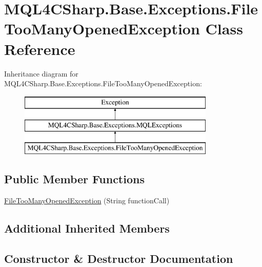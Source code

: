 \hypertarget{class_m_q_l4_c_sharp_1_1_base_1_1_exceptions_1_1_file_too_many_opened_exception}{}\section{M\+Q\+L4\+C\+Sharp.\+Base.\+Exceptions.\+File\+Too\+Many\+Opened\+Exception Class Reference}
\label{class_m_q_l4_c_sharp_1_1_base_1_1_exceptions_1_1_file_too_many_opened_exception}
Inheritance diagram for M\+Q\+L4\+C\+Sharp.\+Base.\+Exceptions.\+File\+Too\+Many\+Opened\+Exception\+:\begin{figure}[H]
\begin{center}
\leavevmode
\includegraphics[height=3.000000cm]{class_m_q_l4_c_sharp_1_1_base_1_1_exceptions_1_1_file_too_many_opened_exception}
\end{center}
\end{figure}
\subsection*{Public Member Functions}
\begin{DoxyCompactItemize}
\item 
\hyperlink{class_m_q_l4_c_sharp_1_1_base_1_1_exceptions_1_1_file_too_many_opened_exception_a67459a21046b95dffc7075430d3cb3e7}{File\+Too\+Many\+Opened\+Exception} (String function\+Call)
\end{DoxyCompactItemize}
\subsection*{Additional Inherited Members}


\subsection{Constructor \& Destructor Documentation}
